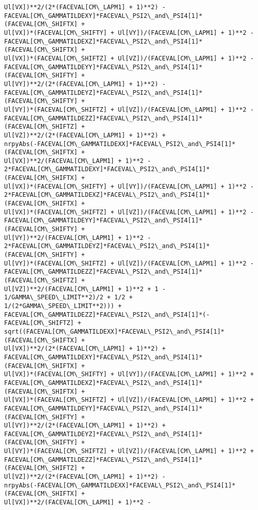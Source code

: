 \documentclass[landscape,letterpaper,10pt,english]{article}
\begin{document}
\begin{Verbatim}[commandchars=\\\{\}]
Ul[VX])**2/(2*(FACEVAL[CM\_LAPM1] + 1)**2) -
FACEVAL[CM\_GAMMATILDEXY]*FACEVAL\_PSI2\_and\_PSI4[1]*(FACEVAL[CM\_SHIFTX] +
Ul[VX])*(FACEVAL[CM\_SHIFTY] + Ul[VY])/(FACEVAL[CM\_LAPM1] + 1)**2 -
FACEVAL[CM\_GAMMATILDEXZ]*FACEVAL\_PSI2\_and\_PSI4[1]*(FACEVAL[CM\_SHIFTX] +
Ul[VX])*(FACEVAL[CM\_SHIFTZ] + Ul[VZ])/(FACEVAL[CM\_LAPM1] + 1)**2 -
FACEVAL[CM\_GAMMATILDEYY]*FACEVAL\_PSI2\_and\_PSI4[1]*(FACEVAL[CM\_SHIFTY] +
Ul[VY])**2/(2*(FACEVAL[CM\_LAPM1] + 1)**2) -
FACEVAL[CM\_GAMMATILDEYZ]*FACEVAL\_PSI2\_and\_PSI4[1]*(FACEVAL[CM\_SHIFTY] +
Ul[VY])*(FACEVAL[CM\_SHIFTZ] + Ul[VZ])/(FACEVAL[CM\_LAPM1] + 1)**2 -
FACEVAL[CM\_GAMMATILDEZZ]*FACEVAL\_PSI2\_and\_PSI4[1]*(FACEVAL[CM\_SHIFTZ] +
Ul[VZ])**2/(2*(FACEVAL[CM\_LAPM1] + 1)**2) +
nrpyAbs(-FACEVAL[CM\_GAMMATILDEXX]*FACEVAL\_PSI2\_and\_PSI4[1]*(FACEVAL[CM\_SHIFTX] +
Ul[VX])**2/(FACEVAL[CM\_LAPM1] + 1)**2 -
2*FACEVAL[CM\_GAMMATILDEXY]*FACEVAL\_PSI2\_and\_PSI4[1]*(FACEVAL[CM\_SHIFTX] +
Ul[VX])*(FACEVAL[CM\_SHIFTY] + Ul[VY])/(FACEVAL[CM\_LAPM1] + 1)**2 -
2*FACEVAL[CM\_GAMMATILDEXZ]*FACEVAL\_PSI2\_and\_PSI4[1]*(FACEVAL[CM\_SHIFTX] +
Ul[VX])*(FACEVAL[CM\_SHIFTZ] + Ul[VZ])/(FACEVAL[CM\_LAPM1] + 1)**2 -
FACEVAL[CM\_GAMMATILDEYY]*FACEVAL\_PSI2\_and\_PSI4[1]*(FACEVAL[CM\_SHIFTY] +
Ul[VY])**2/(FACEVAL[CM\_LAPM1] + 1)**2 -
2*FACEVAL[CM\_GAMMATILDEYZ]*FACEVAL\_PSI2\_and\_PSI4[1]*(FACEVAL[CM\_SHIFTY] +
Ul[VY])*(FACEVAL[CM\_SHIFTZ] + Ul[VZ])/(FACEVAL[CM\_LAPM1] + 1)**2 -
FACEVAL[CM\_GAMMATILDEZZ]*FACEVAL\_PSI2\_and\_PSI4[1]*(FACEVAL[CM\_SHIFTZ] +
Ul[VZ])**2/(FACEVAL[CM\_LAPM1] + 1)**2 + 1 - 1/GAMMA\_SPEED\_LIMIT**2)/2 + 1/2 +
1/(2*GAMMA\_SPEED\_LIMIT**2))) +
FACEVAL[CM\_GAMMATILDEZZ]*FACEVAL\_PSI2\_and\_PSI4[1]*(-FACEVAL[CM\_SHIFTZ] +
sqrt((FACEVAL[CM\_GAMMATILDEXX]*FACEVAL\_PSI2\_and\_PSI4[1]*(FACEVAL[CM\_SHIFTX] +
Ul[VX])**2/(2*(FACEVAL[CM\_LAPM1] + 1)**2) +
FACEVAL[CM\_GAMMATILDEXY]*FACEVAL\_PSI2\_and\_PSI4[1]*(FACEVAL[CM\_SHIFTX] +
Ul[VX])*(FACEVAL[CM\_SHIFTY] + Ul[VY])/(FACEVAL[CM\_LAPM1] + 1)**2 +
FACEVAL[CM\_GAMMATILDEXZ]*FACEVAL\_PSI2\_and\_PSI4[1]*(FACEVAL[CM\_SHIFTX] +
Ul[VX])*(FACEVAL[CM\_SHIFTZ] + Ul[VZ])/(FACEVAL[CM\_LAPM1] + 1)**2 +
FACEVAL[CM\_GAMMATILDEYY]*FACEVAL\_PSI2\_and\_PSI4[1]*(FACEVAL[CM\_SHIFTY] +
Ul[VY])**2/(2*(FACEVAL[CM\_LAPM1] + 1)**2) +
FACEVAL[CM\_GAMMATILDEYZ]*FACEVAL\_PSI2\_and\_PSI4[1]*(FACEVAL[CM\_SHIFTY] +
Ul[VY])*(FACEVAL[CM\_SHIFTZ] + Ul[VZ])/(FACEVAL[CM\_LAPM1] + 1)**2 +
FACEVAL[CM\_GAMMATILDEZZ]*FACEVAL\_PSI2\_and\_PSI4[1]*(FACEVAL[CM\_SHIFTZ] +
Ul[VZ])**2/(2*(FACEVAL[CM\_LAPM1] + 1)**2) -
nrpyAbs(-FACEVAL[CM\_GAMMATILDEXX]*FACEVAL\_PSI2\_and\_PSI4[1]*(FACEVAL[CM\_SHIFTX] +
Ul[VX])**2/(FACEVAL[CM\_LAPM1] + 1)**2 -

\end{Verbatim}
\end{document}

